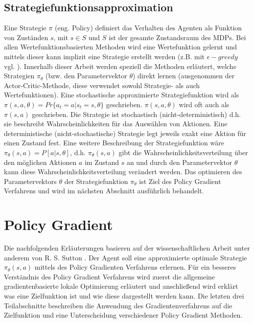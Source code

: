 \documentclass[conference]{IEEEtran}
\begin{document}
\subsection{Strategiefunktionsapproximation}
Eine Strategie $\pi$ (eng. Policy) definiert das Verhalten des Agenten als Funktion von Zuständen $s$, mit $s \in S$ und $S$ ist der gesamte Zustandsraum des MDPs. Bei allen Wertefunktionsbasierten Methoden wird eine Wertefunktion gelernt und mittels dieser kann implizit eine Strategie erstellt werden (z.B. mit $\epsilon-greedy$ vgl. \cite{silver_15}). Innerhalb dieser Arbeit werden speziell die Methoden erläutert, welche Strategien $\pi_\theta$ (bzw. den Parametervektor $\theta$) direkt lernen (ausgenommen der Actor-Critic-Methode, diese verwendet sowohl Strategie- als auch Wertefunktionen). Eine stochastische approximierte Strategiefunktion wird als $\pi(s,a,\theta) = Pr \{ a_t = a | s_t = s, \theta \}$ geschrieben. $\pi(s,a,\theta)$ wird oft auch als $\pi(s,a)$ geschrieben. Die Strategie ist stochastisch (nicht-deterministisch) d.h. sie beschreibt Wahrscheinlichkeiten für das Auswählen von Aktionen. Eine deterministische (nicht-stochastische) Strategie legt jeweils exakt eine Aktion für einen Zustand fest. Eine weitere Beschreibung der Strategiefunktion wäre $\pi_\theta (s,a) = P[a|s,\theta]$, d.h. $\pi_\theta (s,a)$ gibt die Wahrscheinlichkeitsverteilung über den möglichen Aktionen $a$ im Zustand $s$ an und durch den Parametervektor $\theta$ kann diese Wahrscheinlichkeitsverteilung verändert werden. Das optimieren des Parametervektors $\theta$ der Strategiefunktion $\pi_\theta$ ist Ziel des Policy Gradient Verfahrens und wird im nächsten Abschnitt ausführlich behandelt. 

\section{Policy Gradient}
Die nachfolgenden Erläuterungen basieren auf der wissenschaftlichen Arbeit unter anderem von R. S. Sutton \cite{sutton_99}. Der Agent soll eine approximierte optimale Strategie $\pi_\theta (s, a)$ mittels des Policy Gradienten Verfahrens erlernen. Für ein besseres Verständnis des Policy Gradient Verfahrens wird zuerst die allgemeine gradientenbasierte lokale Optimierung erläutert und anschließend wird erklärt was eine Zielfunktion ist und wie diese dargestellt werden kann. Die letzten drei  Teilabschnitte beschreiben die Anwendung des Gradientenverfahrens auf die Zielfunktion und eine Unterscheidung verschiedener Policy Gradient Methoden.
\end{document}
